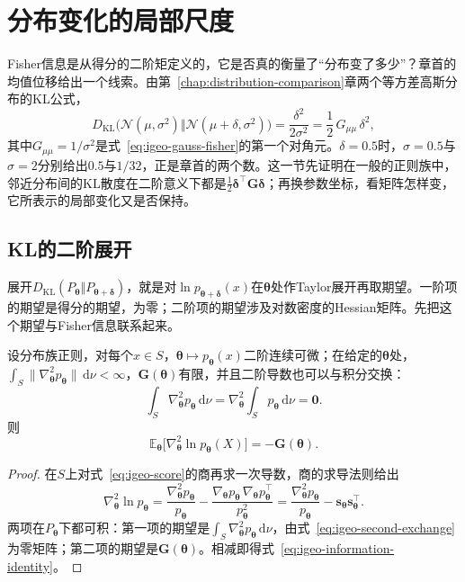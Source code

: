 \section{分布变化的局部尺度}
\label{sec:igeo-local-scale}

Fisher信息是从得分的二阶矩定义的，它是否真的衡量了“分布变了多少”？章首的均值位移给出一个线索。由第~\ref{chap:distribution-comparison}章两个等方差高斯分布的KL公式，
\[
  D_{\mathrm{KL}}\bigl(\mathcal{N}(\mu,\sigma^{2})\Vert\mathcal{N}(\mu+\delta,\sigma^{2})\bigr)=\frac{\delta^{2}}{2\sigma^{2}}=\frac12\,G_{\mu\mu}\,\delta^{2},
\]
其中$G_{\mu\mu}=1/\sigma^{2}$是式~\eqref{eq:igeo-gauss-fisher}的第一个对角元。$\delta=0.5$时，$\sigma=0.5$与$\sigma=2$分别给出$0.5$与$1/32$，正是章首的两个数。这一节先证明在一般的正则族中，邻近分布间的KL散度在二阶意义下都是$\frac12\bm{\delta}^{\top}\bm{G}\bm{\delta}$；再换参数坐标，看矩阵怎样变，它所表示的局部变化又是否保持。

\subsection{KL的二阶展开}
\label{sec:igeo-kl-expansion}

展开$D_{\mathrm{KL}}(P_{\bm{\theta}}\Vert P_{\bm{\theta}+\bm{\delta}})$，就是对$\ln p_{\bm{\theta}+\bm{\delta}}(x)$在$\bm{\theta}$处作Taylor展开再取期望。一阶项的期望是得分的期望，为零；二阶项的期望涉及对数密度的Hessian矩阵。先把这个期望与Fisher信息联系起来。

\begin{lemma}[信息等式]
\label{lem:igeo-information-identity}
设分布族正则，对每个$x\in S$，$\bm{\theta}\mapsto p_{\bm{\theta}}(x)$二阶连续可微；在给定的$\bm{\theta}$处，$\int_{S}\lVert\nabla_{\bm{\theta}}^{2}p_{\bm{\theta}}\rVert\,\mathrm{d}\nu<\infty$，$\bm{G}(\bm{\theta})$有限，并且二阶导数也可以与积分交换：
\begin{equation}
  \int_{S}\nabla_{\bm{\theta}}^{2}p_{\bm{\theta}}\,\mathrm{d}\nu=\nabla_{\bm{\theta}}^{2}\int_{S}p_{\bm{\theta}}\,\mathrm{d}\nu=\bm{0}.
  \label{eq:igeo-second-exchange}
\end{equation}
则
\begin{equation}
  \mathbb{E}_{\bm{\theta}}\bigl[\nabla_{\bm{\theta}}^{2}\ln p_{\bm{\theta}}(X)\bigr]=-\bm{G}(\bm{\theta}).
  \label{eq:igeo-information-identity}
\end{equation}
\end{lemma}

\begin{proof}
在$S$上对式~\eqref{eq:igeo-score}的商再求一次导数，商的求导法则给出
\[
  \nabla_{\bm{\theta}}^{2}\ln p_{\bm{\theta}}=\frac{\nabla_{\bm{\theta}}^{2}p_{\bm{\theta}}}{p_{\bm{\theta}}}-\frac{\nabla_{\bm{\theta}}p_{\bm{\theta}}\,\nabla_{\bm{\theta}}p_{\bm{\theta}}^{\top}}{p_{\bm{\theta}}^{2}}=\frac{\nabla_{\bm{\theta}}^{2}p_{\bm{\theta}}}{p_{\bm{\theta}}}-\bm{s}_{\bm{\theta}}\bm{s}_{\bm{\theta}}^{\top}.
\]
两项在$P_{\bm{\theta}}$下都可积：第一项的期望是$\int_{S}\nabla_{\bm{\theta}}^{2}p_{\bm{\theta}}\,\mathrm{d}\nu$，由式~\eqref{eq:igeo-second-exchange}为零矩阵；第二项的期望是$\bm{G}(\bm{\theta})$。相减即得式~\eqref{eq:igeo-information-identity}。
\end{proof}

